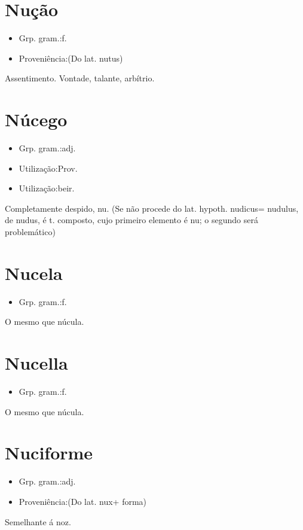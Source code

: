 \section{Nução}
\begin{itemize}
\item {Grp. gram.:f.}
\end{itemize}
\begin{itemize}
\item {Proveniência:(Do lat. \textunderscore nutus\textunderscore )}
\end{itemize}
Assentimento.
Vontade, talante, arbítrio.
\section{Núcego}
\begin{itemize}
\item {Grp. gram.:adj.}
\end{itemize}
\begin{itemize}
\item {Utilização:Prov.}
\end{itemize}
\begin{itemize}
\item {Utilização:beir.}
\end{itemize}
Completamente despido, nu.
(Se não procede do lat. hypoth. \textunderscore nudicus\textunderscore  = \textunderscore nudulus\textunderscore , de \textunderscore nudus\textunderscore , é t. composto, cujo primeiro elemento é \textunderscore nu\textunderscore ; o segundo será problemático)
\section{Nucela}
\begin{itemize}
\item {Grp. gram.:f.}
\end{itemize}
O mesmo que \textunderscore núcula\textunderscore .
\section{Nucella}
\begin{itemize}
\item {Grp. gram.:f.}
\end{itemize}
O mesmo que \textunderscore núcula\textunderscore .
\section{Nuciforme}
\begin{itemize}
\item {Grp. gram.:adj.}
\end{itemize}
\begin{itemize}
\item {Proveniência:(Do lat. \textunderscore nux\textunderscore  + \textunderscore forma\textunderscore )}
\end{itemize}
Semelhante á noz.
